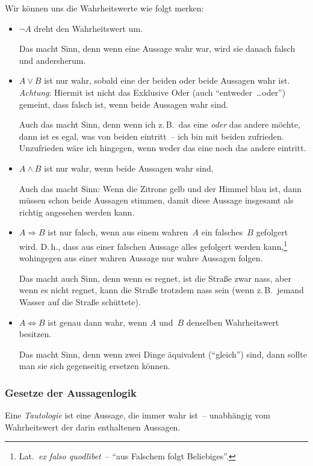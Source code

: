 \documentclass[a4paper]{article}
\begin{document}
Wir können uns die Wahrheitswerte wie folgt merken:
\begin{itemize}
    \item $\neg A$ dreht den Wahrheitswert um.

          Das macht Sinn, denn wenn eine Aussage wahr war, wird sie danach falsch und andersherum.
    \item $A \vee B$ ist nur wahr, sobald eine der beiden oder beide Aussagen wahr ist. \emph{Achtung}: Hiermit ist nicht das Exklusive Oder (auch "`entweder~\dots oder"') gemeint, dass falsch ist, wenn beide Aussagen wahr sind.

          Auch das macht Sinn, denn wenn ich z.\,B.\ das eine \emph{oder} das andere möchte, dann ist es egal, was von beiden eintritt~-- ich bin mit beiden zufrieden. Unzufrieden wäre ich hingegen, wenn weder das eine noch das andere eintritt.
    \item $A \wedge B$ ist nur wahr, wenn beide Aussagen wahr sind.

          Auch das macht Sinn: Wenn die Zitrone gelb und der Himmel blau ist, dann müssen schon beide Aussagen stimmen, damit diese Aussage insgesamt als richtig angesehen werden kann.
    \item $A \Rightarrow B$ ist nur falsch, wenn aus einem wahren~$A$ ein falsches~$B$ gefolgert wird. D.\,h., dass aus einer falschen Aussage alles gefolgert werden kann,\footnote{Lat.\ \emph{ex falso quodlibet}~-- "`aus Falschem folgt Beliebiges"'.} wohingegen aus einer wahren Aussage nur wahre Aussagen folgen.

          Das macht auch Sinn, denn wenn es regnet, ist die Straße zwar nass, aber wenn es nicht regnet, kann die Straße trotzdem nass sein (wenn z.\,B.\ jemand Wasser auf die Straße schüttete).
    \item $A \Leftrightarrow B$ ist genau dann wahr, wenn $A$ und~$B$ denselben Wahrheitswert besitzen.

          Das macht Sinn, denn wenn zwei Dinge äquivalent ("`gleich"') sind, dann sollte man sie sich gegenseitig ersetzen können.
\end{itemize}

\subsubsection{Gesetze der Aussagenlogik}

\begin{definition}[Tautologie]
    Eine \emph{Tautologie} ist eine Aussage, die immer wahr ist~-- unabhängig vom Wahrheitswert der darin enthaltenen Aussagen.
\end{definition}
\end{document}
